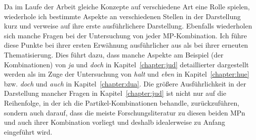 Da im Laufe der Arbeit gleiche Konzepte auf verschiedene Art eine Rolle spielen, wiederhole ich bestimmte Aspekte an verschiedenen Stellen in der Darstellung kurz und verweise auf ihre erste ausführlichere Darstellung. Ebenfalls wiederholen sich manche Fragen bei der Untersuchung von jeder MP-Kombination. Ich führe diese Punkte bei ihrer ersten Erwähnung ausführlicher aus als bei ihrer erneuten Thematisierung. Dies führt dazu, dass manche Aspekte am Beispiel (der Kombinationen) von \textit{ja} und \textit{doch} in Kapitel~\ref{chapter:jud} detaillierter dargestellt werden als im Zuge der Untersuchung von \textit{halt} und \textit{eben} in Kapitel~\ref{chapter:hue} bzw. \textit{doch} und \textit{auch} in Kapitel~\ref{chapter:dua}. Die größere Ausführlichkeit in der Darstellung mancher Fragen in Kapitel~\ref{chapter:jud} ist nicht nur auf die Reihenfolge, in der ich die Partikel-Kombinationen behandle, zurückzuführen, sondern auch darauf, dass die meiste Forschungslite\-ratur zu diesen beiden MPn und auch ihrer Kombination vorliegt und deshalb idealerweise zu Anfang eingeführt wird.
	

